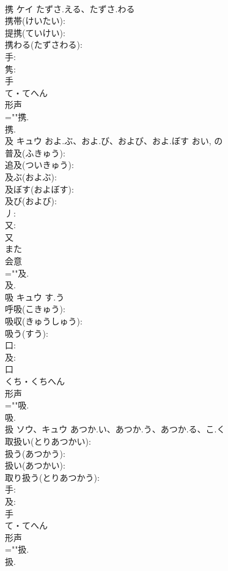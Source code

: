 \documentclass[8pt]{extreport}
\begin{document}
\begin{CJK}{UTF8}{min}
\\	携	ケイ	たずさ.える、たずさ.わる		
\\	携帯(けいたい): 
\\	提携(ていけい): 
\\	携わる(たずさわる): 
\\	手: 
\\	隽: 
\\	手	
\\	て・てへん	
\\	形声 
\\	=""携.
\\	携.
\\	及	キュウ	およ.ぶ、およ.び、および、およ.ぼす	おい, の	
\\	普及(ふきゅう): 
\\	追及(ついきゅう): 
\\	及ぶ(およぶ): 
\\	及ぼす(およぼす): 
\\	及び(および): 
\\	丿: 
\\	又: 
\\	又	
\\	また	
\\	会意 
\\	=""及.
\\	及.
\\	吸	キュウ	す.う		
\\	呼吸(こきゅう): 
\\	吸収(きゅうしゅう): 
\\	吸う(すう): 
\\	口: 
\\	及: 
\\	口	
\\	くち・くちへん	
\\	形声 
\\	=""吸.
\\	吸.
\\	扱	ソウ、キュウ	あつか.い、あつか.う、あつか.る、こ.く		
\\	取扱い(とりあつかい): 
\\	扱う(あつかう): 
\\	扱い(あつかい): 
\\	取り扱う(とりあつかう): 
\\	手: 
\\	及: 
\\	手	
\\	て・てへん	
\\	形声 
\\	=""扱.
\\	扱.

\end{CJK}
\end{document}
